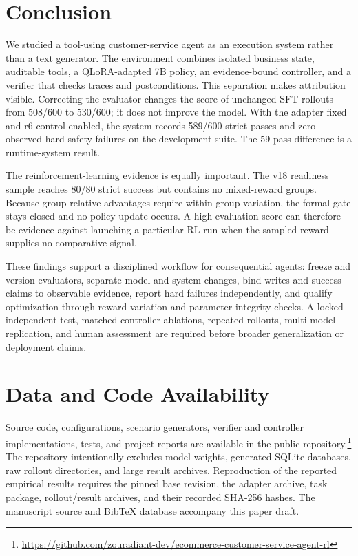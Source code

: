 \documentclass[11pt]{article}
\begin{document}
\section{Conclusion}
\label{sec:conclusion}

We studied a tool-using customer-service agent as an execution system rather than a text generator. The environment combines isolated business state, auditable tools, a QLoRA-adapted 7B policy, an evidence-bound controller, and a verifier that checks traces and postconditions. This separation makes attribution visible. Correcting the evaluator changes the score of unchanged SFT rollouts from 508/600 to 530/600; it does not improve the model. With the adapter fixed and r6 control enabled, the system records 589/600 strict passes and zero observed hard-safety failures on the development suite. The 59-pass difference is a runtime-system result.

The reinforcement-learning evidence is equally important. The v18 readiness sample reaches 80/80 strict success but contains no mixed-reward groups. Because group-relative advantages require within-group variation, the formal gate stays closed and no policy update occurs. A high evaluation score can therefore be evidence against launching a particular RL run when the sampled reward supplies no comparative signal.

These findings support a disciplined workflow for consequential agents: freeze and version evaluators, separate model and system changes, bind writes and success claims to observable evidence, report hard failures independently, and qualify optimization through reward variation and parameter-integrity checks. A locked independent test, matched controller ablations, repeated rollouts, multi-model replication, and human assessment are required before broader generalization or deployment claims.

\section*{Data and Code Availability}

Source code, configurations, scenario generators, verifier and controller implementations, tests, and project reports are available in the public repository.\footnote{\url{https://github.com/zouradiant-dev/ecommerce-customer-service-agent-rl}} The repository intentionally excludes model weights, generated SQLite databases, raw rollout directories, and large result archives. Reproduction of the reported empirical results requires the pinned base revision, the adapter archive, task package, rollout/result archives, and their recorded SHA-256 hashes. The manuscript source and BibTeX database accompany this paper draft.
\end{document}

